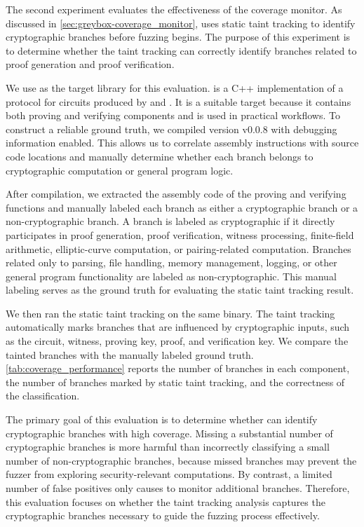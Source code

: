 The second experiment evaluates the effectiveness of the coverage monitor. As discussed in \autoref{sec:greybox-coverage_monitor}, \greyboxfuzz uses static taint tracking to identify cryptographic branches before fuzzing begins. The purpose of this experiment is to determine whether the taint tracking can correctly identify branches related to proof generation and proof verification.

We use \rapidsnark \cite{rapidsnark} as the target library for this evaluation. \rapidsnark is a C++ implementation of a \zksnark protocol for circuits produced by \circom \cite{circom_documentation} and \snarkjs \cite{snarkjs}. It is a suitable target because it contains both proving and verifying components and is used in practical \zksnark workflows. To construct a reliable ground truth, we compiled \rapidsnark version v0.0.8 with debugging information enabled. This allows us to correlate assembly instructions with source code locations and manually determine whether each branch belongs to cryptographic computation or general program logic.

After compilation, we extracted the assembly code of the proving and verifying functions and manually labeled each branch as either a cryptographic branch or a non-cryptographic branch. A branch is labeled as cryptographic if it directly participates in proof generation, proof verification, witness processing, finite-field arithmetic, elliptic-curve computation, or pairing-related computation. Branches related only to parsing, file handling, memory management, logging, or other general program functionality are labeled as non-cryptographic. This manual labeling serves as the ground truth for evaluating the static taint tracking result.

We then ran the static taint tracking on the same \rapidsnark binary. The taint tracking automatically marks branches that are influenced by cryptographic inputs, such as the circuit, witness, proving key, proof, and verification key. We compare the tainted branches with the manually labeled ground truth. \autoref{tab:coverage_performance} reports the number of branches in each component, the number of branches marked by static taint tracking, and the correctness of the classification.

The primary goal of this evaluation is to determine whether \greyboxfuzz can identify cryptographic branches with high coverage. Missing a substantial number of cryptographic branches is more harmful than incorrectly classifying a small number of non-cryptographic branches, because missed branches may prevent the fuzzer from exploring security-relevant computations. By contrast, a limited number of false positives only causes \greyboxfuzz to monitor additional branches. Therefore, this evaluation focuses on whether the taint tracking analysis captures the cryptographic branches necessary to guide the fuzzing process effectively.


